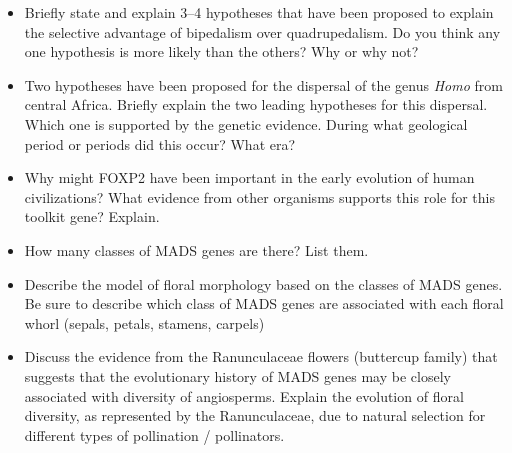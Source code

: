 \documentclass[letterpaper]{tufte-handout}
\begin{document}
\begin{itemize}
	\item Briefly state and explain 3--4 hypotheses that have been proposed to explain the selective advantage of bipedalism over quadrupedalism.  Do you think any one hypothesis is more likely than the others?  Why or why not?

	\item Two hypotheses have been proposed for the dispersal of the genus \textit{Homo} from central Africa.  Briefly explain the two leading hypotheses for this dispersal.  Which one is supported by the genetic evidence.  During what geological period or periods did this occur? What era?

	\item Why might FOXP2 have been important in the early evolution of human civilizations?  What evidence from other organisms supports this role for this toolkit gene? Explain.

	\item How many classes of MADS genes are there?  List them.

	\item Describe the model of floral morphology based on the classes of MADS genes.  Be sure to describe which class of MADS genes are associated with each floral whorl (sepals, petals, stamens, carpels)

	\item Discuss the evidence from the Ranunculaceae flowers (buttercup family) that suggests that the evolutionary history of MADS genes may be closely associated with diversity of angiosperms.  Explain the evolution of floral diversity, as represented by the Ranunculaceae, due to natural selection for different types of pollination / pollinators.

\end{itemize}
\end{document}

